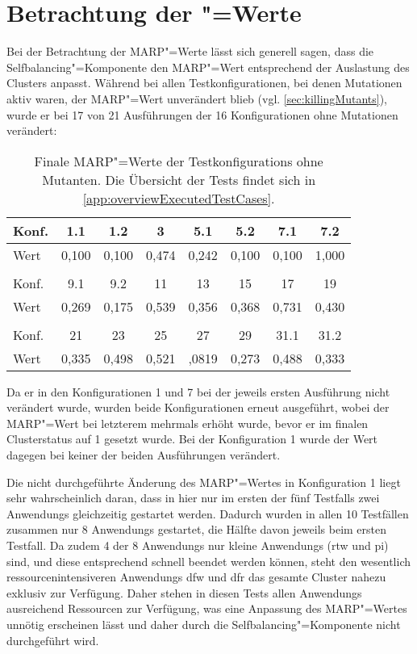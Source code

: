 \section{Betrachtung der "=Werte}
\label{sec:marpValueResults}

Bei der Betrachtung der \gls{MARP}"=Werte lässt sich generell sagen, dass die Selfbalancing"=Komponente den \gls{MARP}"=Wert entsprechend der Auslastung des Clusters anpasst.
Während bei allen Testkonfigurationen, bei denen Mutationen aktiv waren, der \gls{MARP}"=Wert unverändert blieb (vgl. \cref{sec:killingMutants}), wurde er bei 17 von 21 Ausführungen der 16 Konfigurationen ohne Mutationen verändert:

\begin{table}[h]
    \begin{tabular}{l|c|c|c|c|c|c|c}
    	Konf. &  1.1  &  1.2  &   3   &  5.1  &  5.2  &  7.1  &  7.2  \\ \hline
    	Wert  & 0,100 & 0,100 & 0,474 & 0,242 & 0,100 & 0,100 & 1,000 \\
    	\multicolumn{8}{c}{} \\
    	Konf. &  9.1  &  9.2  &  11   &  13   &  15   &  17   &  19   \\ \hline
    	Wert  & 0,269 & 0,175 & 0,539 & 0,356 & 0,368 & 0,731 & 0,430 \\
    	\multicolumn{8}{c}{} \\
    	Konf. &  21   &  23   &  25   &  27   &  29   & 31.1  & 31.2  \\ \hline
    	Wert  & 0,335 & 0,498 & 0,521 & ,0819 & 0,273 & 0,488 & 0,333
    \end{tabular}
    \caption[Finale \acrshort{MARP}"=Werte der \glspl{Testkonfiguration} ohne Mutanten.]
    {Finale \acrshort{MARP}"=Werte der \glspl{Testkonfiguration} ohne Mutanten. Die Übersicht der Tests findet sich in \cref{app:overviewExecutedTestCases}.}
    \label{tab:finalMarpValues}
\end{table}

Da er in den Konfigurationen 1 und 7 bei der jeweils ersten Ausführung nicht verändert wurde, wurden beide Konfigurationen erneut ausgeführt, wobei der \gls{MARP}"=Wert bei letzterem mehrmals erhöht wurde, bevor er im finalen Clusterstatus auf 1 gesetzt wurde.
Bei der Konfiguration 1 wurde der Wert dagegen bei keiner der beiden Ausführungen verändert.

Die nicht durchgeführte Änderung des \gls{MARP}"=Wertes in Konfiguration 1 liegt sehr wahrscheinlich daran, dass in hier nur im ersten der fünf \glspl{Testfall} zwei \glspl{Anwendung} gleichzeitig gestartet werden.
Dadurch wurden in allen 10 Testfällen zusammen nur 8 \glspl{Anwendung} gestartet, die Hälfte davon jeweils beim ersten Testfall.
Da zudem 4 der 8 \glspl{Anwendung} nur kleine \glspl{Anwendung} (\acrlong{rtw} und \acrlong{pi}) sind, und diese entsprechend schnell beendet werden können, steht den wesentlich ressourcenintensiveren \glspl{Anwendung} \acrlong{dfw} und \acrlong{dfr} das gesamte Cluster nahezu exklusiv zur Verfügung.
Daher stehen in diesen \glspl{Test} allen \glspl{Anwendung} ausreichend Ressourcen zur Verfügung, was eine Anpassung des \gls{MARP}"=Wertes unnötig erscheinen lässt und daher durch die Selfbalancing"=Komponente nicht durchgeführt wird.

